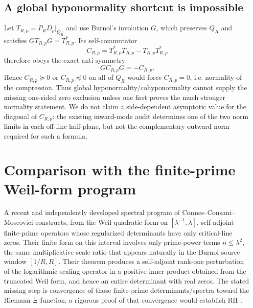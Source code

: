 \documentclass[11pt]{article}
\theoremstyle{remark}
\begin{document}
\subsection*{A global hyponormality shortcut is impossible}
Let $T_{R,p}=P_RD_p|_{Q_R}$ and use Burnol's involution $G$, which preserves $Q_R$ and satisfies $GT_{R,p}G=T_{R,p}^*$.  Its self-commutator
\[
 C_{R,p}=T_{R,p}^*T_{R,p}-T_{R,p}T_{R,p}^*
\]
therefore obeys the exact anti-symmetry
\begin{equation}\label{eq:commutator-antisym}
 \boxed{GC_{R,p}G=-C_{R,p}.}
\end{equation}
Hence $C_{R,p}\succeq0$ or $C_{R,p}\preceq0$ on all of $Q_R$ would force $C_{R,p}=0$, i.e. normality of the compression.  Thus global hyponormality/cohyponormality cannot supply the missing one-sided zero exclusion unless one first proves the much stronger normality statement.  We do not claim a side-dependent asymptotic value for the diagonal of $C_{R,p}$: the existing inward-mode audit determines one of the two norm limits in each off-line half-plane, but not the complementary outward norm required for such a formula.

\section{Comparison with the finite-prime Weil-form program}
A recent and independently developed spectral program of Connes--Consani--Moscovici constructs, from the Weil quadratic form on $[\lambda^{-1},\lambda]$, self-adjoint finite-prime operators whose regularized determinants have only critical-line zeros.  Their finite form on this interval involves only prime-power terms $n\le\lambda^2$, the same multiplicative scale ratio that appears naturally in the Burnol source window $[1/R,R]$.  Their theorem produces a self-adjoint rank-one perturbation of the logarithmic scaling operator in a positive inner product obtained from the truncated Weil form, and hence an entire determinant with real zeros.  The stated missing step is convergence of those finite-prime determinants/spectra toward the Riemann $\Xi$ function; a rigorous proof of that convergence would establish RH \cite{ConnesConsaniMoscovici2025}.
\end{document}
